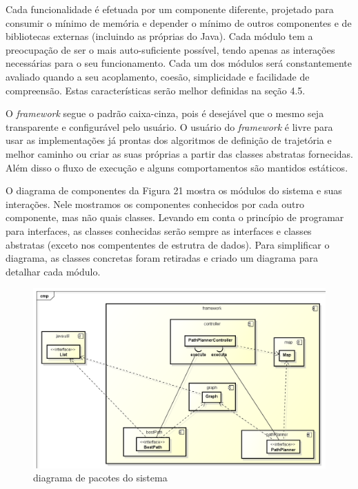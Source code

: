 Cada funcionalidade é efetuada por um componente diferente, projetado para consumir o mínimo de memória e depender o mínimo de outros componentes e de bibliotecas externas (incluindo as próprias do Java). Cada módulo tem a preocupação de ser o mais auto-suficiente possível, tendo apenas as interações necessárias para o seu funcionamento. Cada um dos módulos será constantemente avaliado quando a seu acoplamento, coesão,  simplicidade e facilidade de compreensão. Estas características serão melhor definidas na seção 4.5.

O \textit{framework} segue o padrão caixa-cinza, pois é desejável que o mesmo seja transparente e configurável pelo usuário. O usuário do \textit{framework} é livre para usar as implementações já prontas dos algoritmos de definição de trajetória e melhor caminho ou criar as suas próprias a partir das classes abstratas fornecidas. Além disso o fluxo de execução e alguns comportamentos são mantidos estáticos.

O diagrama de componentes da Figura 21 mostra os módulos do sistema e suas interações. Nele mostramos os componentes conhecidos por cada outro componente, mas não quais classes. Levando em conta o princípio de programar para interfaces, as classes conhecidas serão sempre as interfaces e classes abstratas (exceto nos compententes de estrutra de dados). Para simplificar o diagrama, as classes concretas foram retiradas e criado um diagrama para detalhar cada módulo.

\begin{figure}[h]
	\centering
	\label{fig21}
		\includegraphics[keepaspectratio=true,scale=0.4]{figuras/componentes.png}
	\caption{diagrama de pacotes do sistema}
\end{figure}

